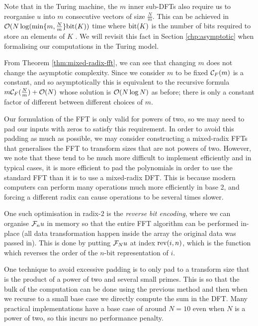 Note that in the Turing machine, the $m$ inner sub-DFTs also require us to reorganise $u$ into $m$ consecutive vectors of size $\frac{N}{m}$. This can be achieved in $\mathcal O(N \log( \min \{m, \frac{N}{m}\}\textrm{bit}(K))$ time where $\textrm{bit}(K)$ is the number of bits required to store an elements of $K$ \cite{ffnlogn}. We will revisit this fact in Section \ref{chp:asymptotic} when formalising our computations in the Turing model.

From Theorem \ref{thm:mixed-radix-fft}, we can see that changing $m$ does not change the asymptotic complexity. Since we consider $m$ to be fixed $\mathcal C_F(m)$ is a constant, and so asymptotically this is equivalent to the recursive formula $m\mathcal C_F(\frac{N}{m}) + \mathcal O(N)$ whose solution is $\mathcal O(N \log N)$ as before; there is only a constant factor of different between different choices of $m$.

\begin{remark}

    Our formulation of the FFT is only valid for powers of two, so we may need to pad our inputs with zeros to satisfy this requirement. In order to avoid this padding as much as possible, we may consider constructing a mixed-radix FFTs that generalises the FFT to transform sizes that are not powers of two. However, we note that these tend to be much more difficult to implement efficiently and in typical cases, it is more efficient to pad the polynomials in order to use the standard FFT than it is to use a mixed-radix DFT. This is because modern computers can perform many operations much more efficiently in base 2, and forcing a different radix can cause operations to be several times slower.

    One such optimisation in radix-$2$ is the \emph{reverse bit encoding}, where we can organise $\mathcal F_n u$ in memory so that the entire FFT algorithm can be performed in-place (all data transformation happen inside the array the original data was passed in). This is done by putting $\mathcal F_N u$ at index $\textrm{rev}(i, n)$, which is the function which reverses the order of the $n$-bit representation of $i$.

    One technique to avoid excessive padding is to only pad to a transform size that is the product of a power of two and several small primes.
    This is so that the bulk of the computation can be done using the previous method and then when we recurse to a small base case we directly compute the sum in the DFT. Many practical implementations have a base case of around $N = 10$ even when $N$ is a power of two, so this incurs no performance penalty.

\end{remark}


